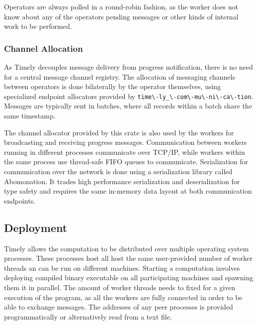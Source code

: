 Operators are always polled in a round-robin fashion, as the worker does
not know about any of the operators pending messages or other kinds of
internal work to be performed.

\subsubsection{Channel Allocation}

As Timely decouples message delivery from progress notification, there is no
need for a central message channel registry. The allocation of messaging
channels between operators is done bilaterally by the operator themselves,
using specialized endpoint allocators provided by
\lstinline{time\-ly_\-com\-mu\-ni\-ca\-tion}. Messages are typically sent in
batches, where all records within a batch share the same timestamp.

The channel allocator provided by this crate is also used by the workers for
broadcasting and receiving progress messages. Communication between workers
running in different processes communicate over TCP/IP, while workers within
the same process use thread-safe FIFO queues to communicate.
Serialization for communication over the network is done using a serialization
library called Abomonation. It trades high performance serialization and 
deserialization for type safety and requires the same in-memory data layout
at both communication endpoints.

\subsection{Deployment}

Timely allows the computation to be distributed over multiple operating system
processes. These processes host all host the same user-provided number of
worker threads an can be run on different machines. Starting a computation
involves deploying compiled binary executable on all participating machines
and spawning them it in parallel.
The amount of worker threads needs to fixed for a given execution of the
program, as all the workers are fully connected in order to be able to exchange
messages. The addresses of any peer processes is provided programmatically
or alternatively read from a text file.

